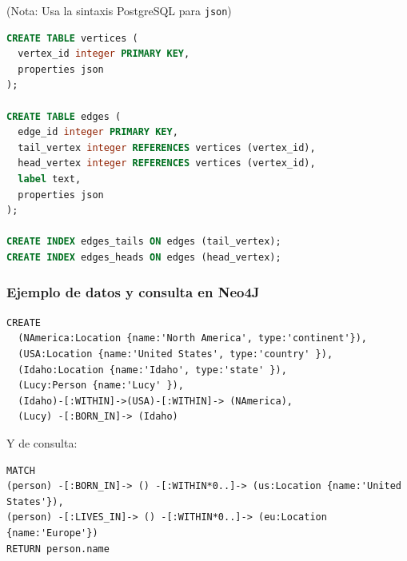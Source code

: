 \documentclass[14pt]{beamer}
\begin{document}
\begin{frame}
(Nota: Usa la sintaxis PostgreSQL para {\tt json})
\begin{lstlisting}[language=SQL]
CREATE TABLE vertices (
  vertex_id integer PRIMARY KEY,
  properties json
);

CREATE TABLE edges (
  edge_id integer PRIMARY KEY,
  tail_vertex integer REFERENCES vertices (vertex_id),
  head_vertex integer REFERENCES vertices (vertex_id),
  label text,
  properties json
);

CREATE INDEX edges_tails ON edges (tail_vertex);
CREATE INDEX edges_heads ON edges (head_vertex);
\end{lstlisting}
\end{frame}

\begin{frame}
  \frametitle{Ejemplo de datos y consulta en Neo4J}
\begin{block}{}
\begin{lstlisting}
CREATE
  (NAmerica:Location {name:'North America', type:'continent'}),
  (USA:Location {name:'United States', type:'country' }),
  (Idaho:Location {name:'Idaho', type:'state' }),
  (Lucy:Person {name:'Lucy' }),
  (Idaho)-[:WITHIN]->(USA)-[:WITHIN]-> (NAmerica),
  (Lucy) -[:BORN_IN]-> (Idaho)
\end{lstlisting}
\end{block}

\framebreak

Y de consulta:
\begin{block}{}
\begin{lstlisting}
MATCH
(person) -[:BORN_IN]-> () -[:WITHIN*0..]-> (us:Location {name:'United States'}),
(person) -[:LIVES_IN]-> () -[:WITHIN*0..]-> (eu:Location {name:'Europe'})
RETURN person.name
\end{lstlisting}
\end{block}
\end{frame}
\end{document}
